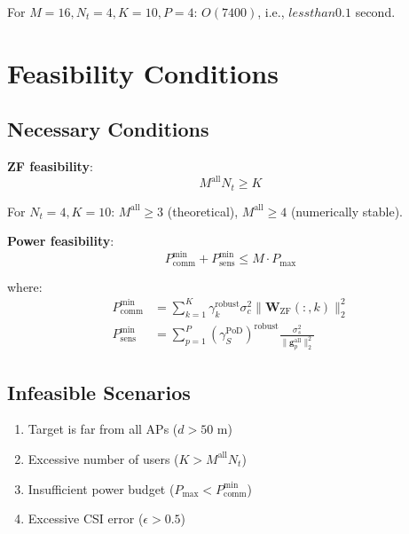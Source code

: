 \documentclass[12pt,a4paper]{article}
\newcommand{\vect}[1]{\mathbf{#1}}
\newcommand{\mat}[1]{\mathbf{#1}}
\newcommand{\norm}[1]{\|#1\|_2}
\begin{document}
For $M=16, N_t=4, K=10, P=4$: $O(7400)$, i.e., $less than 0.1$ second.

\section{Feasibility Conditions}

\subsection{Necessary Conditions}

\textbf{ZF feasibility}:
\begin{equation}
M^{\text{all}} N_t \geq K
\end{equation}

For $N_t=4, K=10$: $M^{\text{all}} \geq 3$ (theoretical), $M^{\text{all}} \geq 4$ (numerically stable).

\textbf{Power feasibility}:
\begin{equation}
P_{\text{comm}}^{\min} + P_{\text{sens}}^{\min} \leq M \cdot P_{\max}
\end{equation}

where:
\begin{align}
P_{\text{comm}}^{\min} &= \sum_{k=1}^K \gamma_k^{\text{robust}} \sigma_c^2 \norm{\mat{W}_{\text{ZF}}(:,k)}^2 \\
P_{\text{sens}}^{\min} &= \sum_{p=1}^P (\gamma_S^{\text{PoD}})^{\text{robust}} \frac{\sigma_s^2}{\norm{\vect{g}_p^{\text{all}}}^2}
\end{align}

\subsection{Infeasible Scenarios}

\begin{enumerate}
    \item Target is far from all APs ($d > 50$ m)
    \item Excessive number of users ($K > M^{\text{all}}N_t$)
    \item Insufficient power budget ($P_{\max} < P_{\text{comm}}^{\min}$)
    \item Excessive CSI error ($\epsilon > 0.5$)
\end{enumerate}

\end{document}
